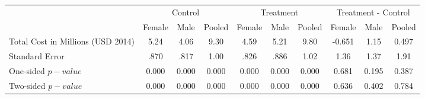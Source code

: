 \begin{tabular}{lccccccccc} \hline \hline
 & \multicolumn{3}{c}{Control} & \multicolumn{3}{c}{Treatment} & \multicolumn{3}{c}{Treatment - Control} \\ 
 & Female  & Male  & Pooled  & Female  & Male  & Pooled  & Female  & Male  & Pooled  \\  \hline 
Total Cost  in Millions  (USD 2014) &  5.24 &  4.06 &  9.30 &  4.59 &  5.21 &  9.80 & -0.651 &  1.15 &  0.497 \\  
Standard Error &  .870 &  .817 &  1.00 &  .826 &  .886 &  1.02 &  1.36 &  1.37 &  1.91 \\  
One-sided $p-value$ &     0.000 &     0.000 &     0.000 &     0.000 &     0.000 &     0.000 &     0.681 &     0.195 &     0.387 \\  
Two-sided $p-value$ &     0.000 &     0.000 &     0.000 &     0.000 &     0.000 &     0.000 &     0.636 &     0.402 &     0.784 \\  
\hline \hline \end{tabular}